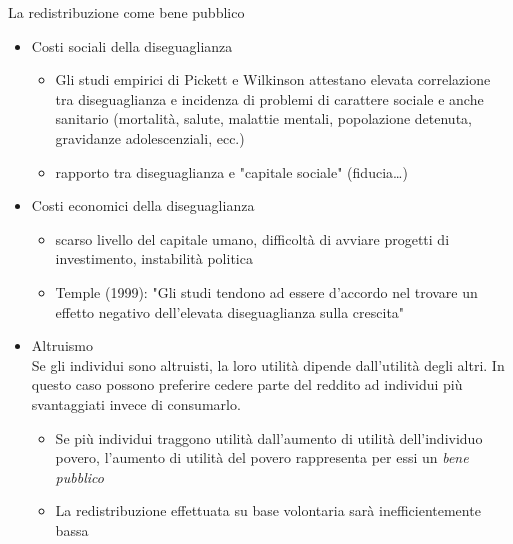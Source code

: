 \documentclass[11pt]{beamer}
\begin{document}
\begin{frame}{La redistribuzione come bene pubblico}
\begin{itemize}
\item \alert{Costi sociali della diseguaglianza}\\[0pt]
\begin{itemize}
\item Gli studi empirici di Pickett e Wilkinson attestano elevata correlazione
tra diseguaglianza e incidenza di problemi di carattere sociale e anche
sanitario (mortalità, salute, malattie mentali, popolazione detenuta,
gravidanze adolescenziali, ecc.)
\item rapporto tra diseguaglianza e "capitale sociale" (fiducia\ldots{})
\end{itemize}

\item \alert{Costi economici della diseguaglianza}\\[0pt]
\begin{itemize}
\item scarso livello del capitale umano, difficoltà di avviare progetti di
investimento, instabilità politica
\item Temple (1999): "Gli studi tendono ad essere d'accordo nel trovare un
effetto negativo dell'elevata diseguaglianza sulla crescita"
\end{itemize}

\item \alert{Altruismo}\\[0pt]
Se gli individui sono altruisti, la loro utilità dipende dall'utilità degli
altri. In questo caso possono preferire cedere parte del reddito ad
individui più svantaggiati invece di consumarlo.
\begin{itemize}
\item Se più individui traggono utilità dall'aumento di utilità dell'individuo
povero, l'aumento di utilità del povero rappresenta per essi un \emph{bene
pubblico}
\item La redistribuzione effettuata su base
volontaria sarà inefficientemente bassa
\end{itemize}
\end{itemize}
\end{frame}
\end{document}
